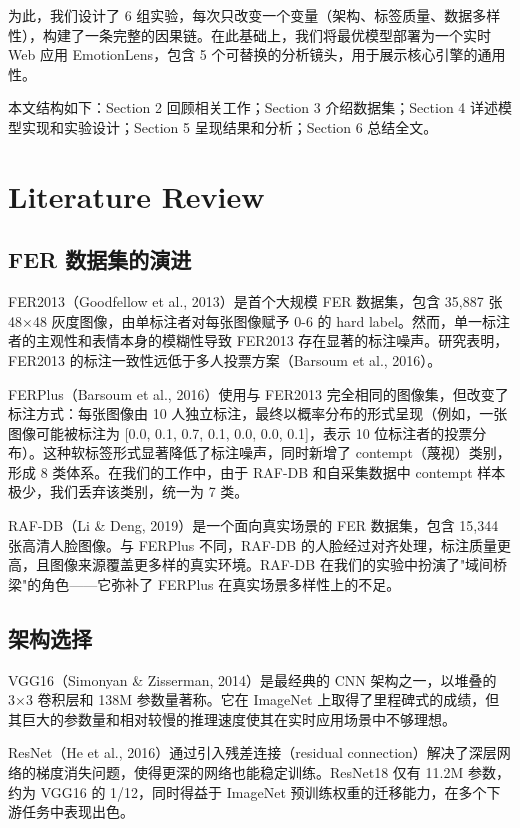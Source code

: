 \documentclass[12pt,a4paper]{article}
\begin{document}
为此，我们设计了 6 组实验，每次只改变一个变量（架构、标签质量、数据多样性），构建了一条完整的因果链。在此基础上，我们将最优模型部署为一个实时 Web 应用 EmotionLens，包含 5 个可替换的分析镜头，用于展示核心引擎的通用性。

本文结构如下：Section 2 回顾相关工作；Section 3 介绍数据集；Section 4 详述模型实现和实验设计；Section 5 呈现结果和分析；Section 6 总结全文。

\section{Literature Review}

\subsection{FER 数据集的演进}

FER2013（Goodfellow et al., 2013）是首个大规模 FER 数据集，包含 35,887 张 48×48 灰度图像，由单标注者对每张图像赋予 0-6 的 hard label。然而，单一标注者的主观性和表情本身的模糊性导致 FER2013 存在显著的标注噪声。研究表明，FER2013 的标注一致性远低于多人投票方案（Barsoum et al., 2016）。

FERPlus（Barsoum et al., 2016）使用与 FER2013 完全相同的图像集，但改变了标注方式：每张图像由 10 人独立标注，最终以概率分布的形式呈现（例如，一张图像可能被标注为 [0.0, 0.1, 0.7, 0.1, 0.0, 0.0, 0.1]，表示 10 位标注者的投票分布）。这种软标签形式显著降低了标注噪声，同时新增了 contempt（蔑视）类别，形成 8 类体系。在我们的工作中，由于 RAF-DB 和自采集数据中 contempt 样本极少，我们丢弃该类别，统一为 7 类。

RAF-DB（Li \& Deng, 2019）是一个面向真实场景的 FER 数据集，包含 15,344 张高清人脸图像。与 FERPlus 不同，RAF-DB 的人脸经过对齐处理，标注质量更高，且图像来源覆盖更多样的真实环境。RAF-DB 在我们的实验中扮演了"域间桥梁"的角色——它弥补了 FERPlus 在真实场景多样性上的不足。

\subsection{架构选择}

VGG16（Simonyan \& Zisserman, 2014）是最经典的 CNN 架构之一，以堆叠的 3×3 卷积层和 138M 参数量著称。它在 ImageNet 上取得了里程碑式的成绩，但其巨大的参数量和相对较慢的推理速度使其在实时应用场景中不够理想。

ResNet（He et al., 2016）通过引入残差连接（residual connection）解决了深层网络的梯度消失问题，使得更深的网络也能稳定训练。ResNet18 仅有 11.2M 参数，约为 VGG16 的 1/12，同时得益于 ImageNet 预训练权重的迁移能力，在多个下游任务中表现出色。
\end{document}
